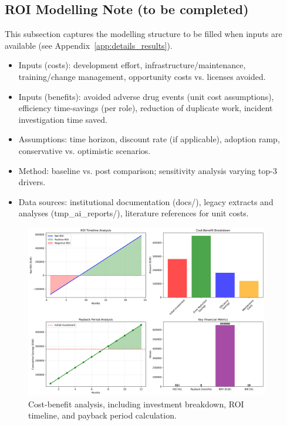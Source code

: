 \subsection*{ROI Modelling Note (to be completed)}
This subsection captures the modelling structure to be filled when inputs are available (see Appendix~\ref{app:details_results}).
\begin{itemize}
    \item Inputs (costs): development effort, infrastructure/maintenance, training/change management, opportunity costs vs. licenses avoided.
    \item Inputs (benefits): avoided adverse drug events (unit cost assumptions), efficiency time-savings (per role), reduction of duplicate work, incident investigation time saved.
    \item Assumptions: time horizon, discount rate (if applicable), adoption ramp, conservative vs. optimistic scenarios.
    \item Method: baseline vs. post comparison; sensitivity analysis varying top-3 drivers.
    \item Data sources: institutional documentation (docs/), legacy extracts and analyses (tmp\_ai\_reports/), literature references for unit costs.
\end{itemize}

\begin{figure}[htbp]
    \centering
    \includegraphics[width=0.95\textwidth]{images/generated/roi_analysis.png}
    \caption{Cost-benefit analysis, including investment breakdown, ROI timeline, and payback period calculation.}
    \label{fig:roi-analysis}
\end{figure}


